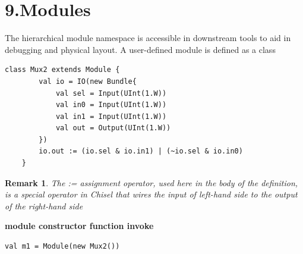 \documentclass[11pt]{article}
\newtheorem*{remark}{Remark}
\begin{document}
\section*{9.Modules}

The hierarchical module namespace is accessible in downstream tools to aid in debugging and physical layout. A user-defined module is defined as a class
\begin{lstlisting}[style = myScalastyle]
	class Mux2 extends Module {
		val io = IO(new Bundle{
			val sel = Input(UInt(1.W))
			val in0 = Input(UInt(1.W))
			val in1 = Input(UInt(1.W))
			val out = Output(UInt(1.W))
		})
		io.out := (io.sel & io.in1) | (~io.sel & io.in0)
	}
\end{lstlisting}

\begin{remark}
	The := assignment operator, used here in the body of the definition, is a special operator in Chisel that wires the input of left-hand side to the output of the right-hand side
\end{remark}

\textbf{module constructor function invoke}

\begin{lstlisting}[style = myScalastyle]
val m1 = Module(new Mux2())
\end{lstlisting}
\end{document}
